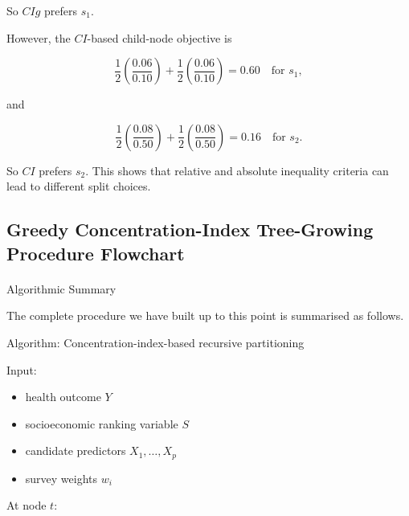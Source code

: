 \documentclass[
  11pt,
  a4paper,
]{article}
\makeatletter
\let\oldparagraph\paragraph
\renewcommand{\paragraph}{
    \@ifstar
      \xxxParagraphStar
      \xxxParagraphNoStar
  }
\newcommand{\xxxParagraphStar}[1]{\oldparagraph*{#1}\mbox{}}
\newcommand{\xxxParagraphNoStar}[1]{\oldparagraph{#1}\mbox{}}
\providecommand{\tightlist}{%
  \setlength{\itemsep}{0pt}\setlength{\parskip}{0pt}}
\makeatother
\begin{document}
So \(CIg\) prefers \(s_1\).

However, the \(CI\)-based child-node objective is

\[
\frac12\left(\frac{0.06}{0.10}\right)+\frac12\left(\frac{0.06}{0.10}\right)=0.60
\quad \text{for } s_1,
\]

and

\[
\frac12\left(\frac{0.08}{0.50}\right)+\frac12\left(\frac{0.08}{0.50}\right)=0.16
\quad \text{for } s_2.
\]

So \(CI\) prefers \(s_2\). This shows that relative and absolute
inequality criteria can lead to different split choices.

\subsection{Greedy Concentration-Index Tree-Growing Procedure
Flowchart}\label{app-greedy-ci-tree-flow}

\paragraph{Algorithmic Summary}\label{algorithmic-summary}

The complete procedure we have built up to this point is summarised as
follows.

Algorithm: Concentration-index-based recursive partitioning

Input:

\begin{itemize}
\tightlist
\item
  health outcome \(Y\)
\item
  socioeconomic ranking variable \(S\)
\item
  candidate predictors \(X_1,\dots,X_p\)
\item
  survey weights \(w_i\)
\end{itemize}

At node \(t\):
\end{document}
